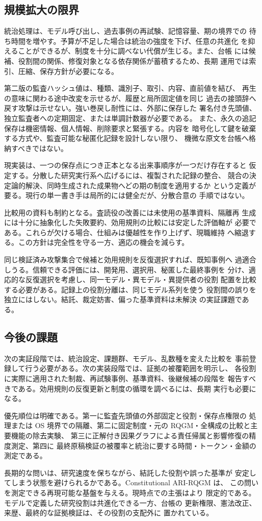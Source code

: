 \subsection{規模拡大の限界}\label{sec:discussion:scaling}

統治処理は、モデル呼び出し、過去事例の再試験、記憶容量、期の境界での
待ち時間を増やす。予算が不足した場合は統治の強度を下げ、任意の共進化
を抑えることができるが、制度を十分に調べない代償が生じる。また、台帳
には候補、役割間の関係、修復対象となる依存関係が蓄積するため、長期
運用では索引、圧縮、保存方針が必要になる。

第二版の監査ハッシュ値は、種類、識別子、取引、内容、直前値を結び、
再生の意味に関わる途中改変を示せるが、履歴と局所固定値を同じ
過去の接頭辞へ戻す攻撃は示せない。強い巻戻し耐性には、外部に保存した
署名付き先頭値、独立監査者への定期固定、または単調計数器が必要である。
また、永久の追記保存は機密情報、個人情報、削除要求と緊張する。内容を
暗号化して鍵を破棄する方式や、監査可能な秘匿化記録を設計しない限り、
機微な原文を台帳へ格納すべきではない。

現実装は、一つの保存点につき正本となる出来事順序が一つだけ存在すると
仮定する。分散した研究実行系へ広げるには、複製された記録の整合、
競合の決定論的解決、同時生成された成果物へどの期の制度を適用するか
という定義が要る。現行の単一書き手は局所的には健全だが、分散合意の
手順ではない。

比較用の資料も制約となる。査読役の改善には未使用の基準資料、隔離再
生成には十分に抽象化した失敗要約、効用規則の比較には安定した評価軸が
必要である。これらが欠ける場合、仕組みは優越性を作り上げず、現職維持
へ縮退する。この方針は完全性を守る一方、適応の機会を減らす。

同じ検証済み攻撃集合で候補と効用規則を反復選択すれば、既知事例へ
過適合しうる。信頼できる評価には、開発用、選択用、秘匿した最終事例を
分け、適応的な反復選択を考慮し、同一モデル・異モデル・異提供者の役割
配置を比較する必要がある。記録上の役割分離は、同じモデル系列を使う
役割間の誤りを独立にはしない。結託、裁定妨害、偏った基準資料は未解決
の実証課題である。

\subsection{今後の課題}\label{sec:discussion:outlook}

次の実証段階では、統治設定、課題群、モデル、乱数種を変えた比較を
事前登録して行う必要がある。次の実装段階では、証拠の被覆範囲を明示し、
各役割に実際に適用された制裁、再試験事例、基準資料、後継候補の段階を
報告すべきである。効用規則の反復更新と制度の循環を調べるには、長期
実行も必要になる。

優先順位は明確である。第一に監査先頭値の外部固定と役割・保存点権限の
処理または OS 境界での隔離、第二に固定制度・元の RQGM・全構成の比較と主要機能の除去実験、
第三に正解付き因果グラフによる責任帰属と影響修復の精度測定、第四に
最終原稿検証の被覆率と統治に要する時間・トークン・金額の測定である。

長期的な問いは、研究速度を保ちながら、結託した役割や誤った基準が
安定してしまう状態を避けられるかである。Constitutional ARI-RQGM は、
この問いを測定できる再現可能な基盤を与える。現時点での主張はより
限定的である。モデルで定義した研究役割は共進化できる一方、台帳の
更新権限、憲法改正、来歴、最終的な証拠検証は、その役割の支配外に
置かれている。
